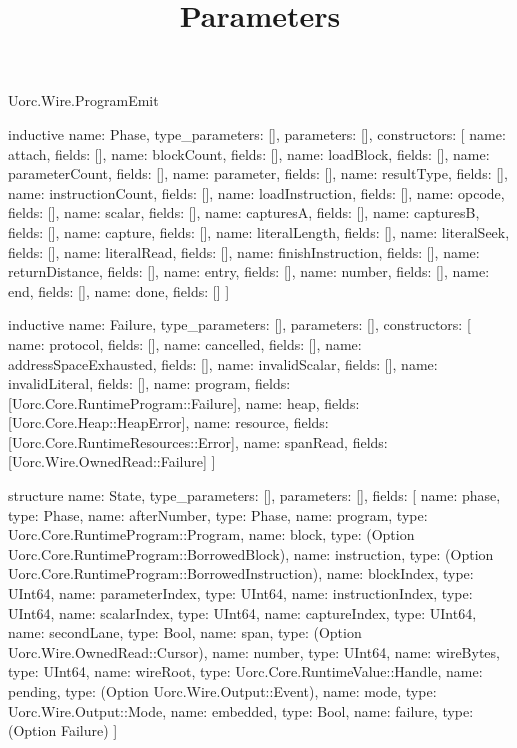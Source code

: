 \begin{lexlean}{Uorc.Wire.ProgramEmit}
\title{Parameters}
\begin{semanticmodule}
inductive{
  name: Phase,
  type_parameters: [],
  parameters: [],
  constructors: [
    {name: attach, fields: []},
    {name: blockCount, fields: []},
    {name: loadBlock, fields: []},
    {name: parameterCount, fields: []},
    {name: parameter, fields: []},
    {name: resultType, fields: []},
    {name: instructionCount, fields: []},
    {name: loadInstruction, fields: []},
    {name: opcode, fields: []},
    {name: scalar, fields: []},
    {name: capturesA, fields: []},
    {name: capturesB, fields: []},
    {name: capture, fields: []},
    {name: literalLength, fields: []},
    {name: literalSeek, fields: []},
    {name: literalRead, fields: []},
    {name: finishInstruction, fields: []},
    {name: returnDistance, fields: []},
    {name: entry, fields: []},
    {name: number, fields: []},
    {name: end, fields: []},
    {name: done, fields: []}
  ]
}

inductive{
  name: Failure,
  type_parameters: [],
  parameters: [],
  constructors: [
    {name: protocol, fields: []},
    {name: cancelled, fields: []},
    {name: addressSpaceExhausted, fields: []},
    {name: invalidScalar, fields: []},
    {name: invalidLiteral, fields: []},
    {name: program, fields: [Uorc.Core.RuntimeProgram::Failure]},
    {name: heap, fields: [Uorc.Core.Heap::HeapError]},
    {name: resource, fields: [Uorc.Core.RuntimeResources::Error]},
    {name: spanRead, fields: [Uorc.Wire.OwnedRead::Failure]}
  ]
}

structure{
  name: State,
  type_parameters: [],
  parameters: [],
  fields: [
    {name: phase, type: Phase},
    {name: afterNumber, type: Phase},
    {name: program, type: Uorc.Core.RuntimeProgram::Program},
    {name: block, type: (Option Uorc.Core.RuntimeProgram::BorrowedBlock)},
    {name: instruction, type: (Option Uorc.Core.RuntimeProgram::BorrowedInstruction)},
    {name: blockIndex, type: UInt64},
    {name: parameterIndex, type: UInt64},
    {name: instructionIndex, type: UInt64},
    {name: scalarIndex, type: UInt64},
    {name: captureIndex, type: UInt64},
    {name: secondLane, type: Bool},
    {name: span, type: (Option Uorc.Wire.OwnedRead::Cursor)},
    {name: number, type: UInt64},
    {name: wireBytes, type: UInt64},
    {name: wireRoot, type: Uorc.Core.RuntimeValue::Handle},
    {name: pending, type: (Option Uorc.Wire.Output::Event)},
    {name: mode, type: Uorc.Wire.Output::Mode},
    {name: embedded, type: Bool},
    {name: failure, type: (Option Failure)}
  ]
}


\end{semanticmodule}
\end{lexlean}
